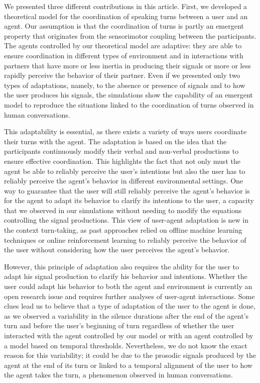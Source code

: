 \documentclass[twocolumn]{svjour3}
\begin{document}
We presented three different contributions in this article. First, we developed a theoretical model for the coordination of speaking turns between a user and an agent. Our assumption is that the coordination of turns is partly an emergent property that originates from the sensorimotor coupling between the participants. 
The agents controlled by our theoretical model are adaptive: they are able to ensure coordination in different types of environment and in interactions with partners that have more or less inertia in producing their signals or more or less rapidly perceive  the behavior of their partner. Even if we presented only two types of adaptations,  namely, to the absence or presence of signals and to how the user produces his signals, the simulations show the capability of an emergent model to reproduce the situations linked to the coordination of turns observed in human conversations.

This adaptability is essential, as there exists a variety of ways users coordinate their turns with the agent. The adaptation is based on the idea that the participants continuously modify  their verbal and non-verbal productions to ensure effective coordination. This highlights the fact that not only must the agent be able to reliably perceive  the user's intentions but also the user has to reliably perceive  the agent's behavior in different environmental settings. One way to guarantee that the user will still reliably perceive the agent's behavior is for the agent to adapt its behavior to clarify its intentions to the user, a capacity that we observed in our simulations without needing to modify the equations controlling the signal productions. This view of user-agent adaptation is new in the context turn-taking, as past approaches relied on offline machine learning techniques or online reinforcement learning to reliably perceive the behavior of the user without considering how the user perceives the agent's behavior. 

However, this principle of adaptation also requires the ability for the user to adapt his signal production to clarify his behavior and intentions. Whether the user could adapt his behavior to both the agent and environment is currently an open research issue and requires further analyses of user-agent interactions. 
Some clues lead us to believe that a type of adaptation of the user to the agent is done, as we observed a variability in the silence durations after the end of the agent's turn and before the user's beginning of turn regardless of whether the user interacted with the agent controlled by our model or with an agent controlled by a model based on temporal thresholds. Nevertheless, we do not know the exact reason for this variability; it could be due to the prosodic signals produced by the agent at the end of its turn or linked to a temporal alignment of the user to how the agent takes the turn, a phenomenon observed in human conversations. 
\end{document}

